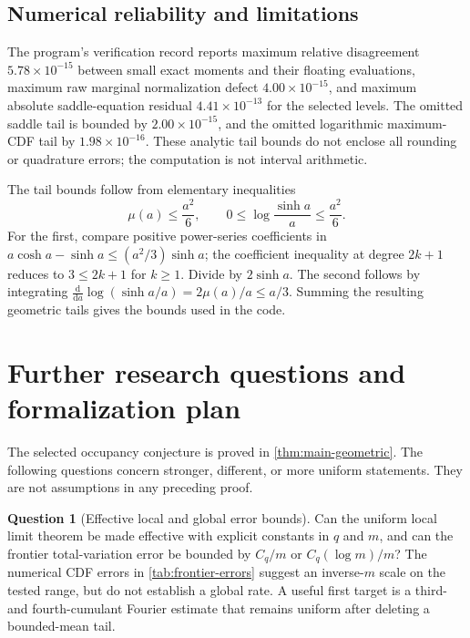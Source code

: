 \documentclass[11pt,a4paper]{article}
\numberwithin{equation}{section}
\theoremstyle{definition}
\newtheorem{question}[theorem]{Question}
\theoremstyle{remark}
\begin{document}
\subsection{Numerical reliability and limitations}
The program's verification record reports maximum relative disagreement
$5.78\times10^{-15}$ between small exact moments and their floating
evaluations, maximum raw marginal normalization defect
$4.00\times10^{-15}$, and maximum absolute saddle-equation residual
$4.41\times10^{-13}$ for the selected levels. The omitted saddle tail is
bounded by $2.00\times10^{-15}$, and the omitted logarithmic maximum-CDF
tail by $1.98\times10^{-16}$. These analytic tail bounds do not enclose
all rounding or quadrature errors; the computation is not interval
arithmetic.

The tail bounds follow from elementary inequalities
\begin{equation}
\mu(a)\le\frac{a^2}{6},\qquad
0\le\log\frac{\sinh a}{a}\le\frac{a^2}{6}.
\label{eq:numeric-tail-bounds}
\end{equation}
For the first, compare positive power-series coefficients in
$a\cosh a-\sinh a\le(a^2/3)\sinh a$; the coefficient inequality
at degree $2k+1$ reduces to $3\le2k+1$ for $k\ge1$.
Divide by $2\sinh a$. The second follows by integrating
$\frac{\mathrm d}{\mathrm da}\log(\sinh a/a)=2\mu(a)/a\le a/3$.
Summing the resulting geometric tails gives the bounds used in the code.

\section{Further research questions and formalization plan}
\label{sec:questions}

The selected occupancy conjecture is proved in
\cref{thm:main-geometric}. The following questions concern stronger,
different, or more uniform statements. They are not assumptions in any
preceding proof.

\begin{question}[Effective local and global error bounds]
Can the uniform local limit theorem be made effective with explicit
constants in $q$ and $m$, and can the frontier total-variation error be
bounded by $C_q/m$ or $C_q(\log m)/m$? The numerical CDF errors in
\cref{tab:frontier-errors} suggest an inverse-$m$ scale on the tested
range, but do not establish a global rate. A useful first target is a
third- and fourth-cumulant Fourier estimate that remains uniform after
deleting a bounded-mean tail.
\end{question}
\end{document}
